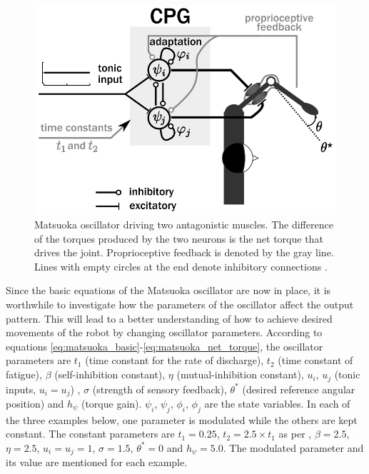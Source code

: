 \documentclass[12pt,twoside]{article}
\theoremstyle{plain}
\theoremstyle{definition}
\theoremstyle{remark}
\newcommand{\forceindent}{\leavevmode{\parindent=2em\indent}}
\begin{document}
\begin{figure}[hbtp]
  \begin{minipage}[c]{0.45\textwidth}
    \includegraphics[width=\textwidth]{figures/matsuoka_diagram.png}
  \end{minipage}\hfill
  \begin{minipage}[c]{0.4\textwidth}
    \caption{Matsuoka oscillator driving two antagonistic muscles. The difference of the torques produced by the two neurons is the net torque that drives the joint. Proprioceptive feedback is denoted by the gray line. Lines with empty circles at the end denote inhibitory connections \cite{Ronsse2009}.
        } \label{fig:matsuoka_diagram}
  \end{minipage}
\end{figure}

\forceindent Since the basic equations of the Matsuoka oscillator are now in place, it is worthwhile to investigate how the parameters of the oscillator affect the output pattern. This will lead to a better understanding of how to achieve desired movements of the robot by changing oscillator parameters. According to equations \ref{eq:matsuoka_basic}-\ref{eq:matsuoka_net_torque}, the oscillator parameters are $t_1$ (time constant for the rate of discharge), $t_2$ (time constant of fatigue), $\beta$ (self-inhibition constant), $\eta$ (mutual-inhibition constant), $u_i$, $u_j$ (tonic inputs, $u_i=u_j$) , $\sigma$ (strength of sensory feedback),  $\theta^*$ (desired reference angular position) and $h_{\psi}$ (torque gain). $\psi_i$, $\psi_j$, $\phi_i$, $\phi_j$ are the state variables. In each of the three examples below, one parameter is modulated while the others are kept constant. The constant parameters are $t_1=0.25$, $t_2= 2.5 \times t_1$ as per \cite{Ronsse2009}, $\beta=2.5$,  $\eta=2.5$, $u_i=u_j=1$, $\sigma=1.5$, $\theta^*=0$ and $h_{\psi}=5.0$. The modulated parameter and its value are mentioned for each example.\\ 
\end{document}
